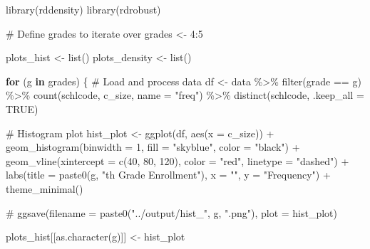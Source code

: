 \documentclass[
  letterpaper,
  DIV=11,
  numbers=noendperiod]{scrartcl}
\newenvironment{Shaded}{\begin{snugshade}}{\end{snugshade}}
\newcommand{\AttributeTok}[1]{\textcolor[rgb]{0.40,0.45,0.13}{#1}}
\newcommand{\CommentTok}[1]{\textcolor[rgb]{0.37,0.37,0.37}{#1}}
\newcommand{\ConstantTok}[1]{\textcolor[rgb]{0.56,0.35,0.01}{#1}}
\newcommand{\ControlFlowTok}[1]{\textcolor[rgb]{0.00,0.23,0.31}{\textbf{#1}}}
\newcommand{\DecValTok}[1]{\textcolor[rgb]{0.68,0.00,0.00}{#1}}
\newcommand{\FunctionTok}[1]{\textcolor[rgb]{0.28,0.35,0.67}{#1}}
\newcommand{\NormalTok}[1]{\textcolor[rgb]{0.00,0.23,0.31}{#1}}
\newcommand{\OtherTok}[1]{\textcolor[rgb]{0.00,0.23,0.31}{#1}}
\newcommand{\SpecialCharTok}[1]{\textcolor[rgb]{0.37,0.37,0.37}{#1}}
\newcommand{\StringTok}[1]{\textcolor[rgb]{0.13,0.47,0.30}{#1}}
\begin{document}
\begin{Shaded}
\begin{Highlighting}[]
\FunctionTok{library}\NormalTok{(rddensity)}
\FunctionTok{library}\NormalTok{(rdrobust)}

\CommentTok{\# Define grades to iterate over}
\NormalTok{grades }\OtherTok{\textless{}{-}} \DecValTok{4}\SpecialCharTok{:}\DecValTok{5}

\NormalTok{plots\_hist }\OtherTok{\textless{}{-}} \FunctionTok{list}\NormalTok{()}
\NormalTok{plots\_density }\OtherTok{\textless{}{-}} \FunctionTok{list}\NormalTok{()}

\ControlFlowTok{for}\NormalTok{ (g }\ControlFlowTok{in}\NormalTok{ grades) \{}
  \CommentTok{\# Load and process data}
\NormalTok{  df }\OtherTok{\textless{}{-}}\NormalTok{ data }\SpecialCharTok{\%\textgreater{}\%}
    \FunctionTok{filter}\NormalTok{(grade }\SpecialCharTok{==}\NormalTok{ g) }\SpecialCharTok{\%\textgreater{}\%}
    \FunctionTok{count}\NormalTok{(schlcode, c\_size, }\AttributeTok{name =} \StringTok{"freq"}\NormalTok{) }\SpecialCharTok{\%\textgreater{}\%}
    \FunctionTok{distinct}\NormalTok{(schlcode, }\AttributeTok{.keep\_all =} \ConstantTok{TRUE}\NormalTok{)}

  \CommentTok{\# Histogram plot}
\NormalTok{  hist\_plot }\OtherTok{\textless{}{-}} \FunctionTok{ggplot}\NormalTok{(df, }\FunctionTok{aes}\NormalTok{(}\AttributeTok{x =}\NormalTok{ c\_size)) }\SpecialCharTok{+}
    \FunctionTok{geom\_histogram}\NormalTok{(}\AttributeTok{binwidth =} \DecValTok{1}\NormalTok{, }\AttributeTok{fill =} \StringTok{"skyblue"}\NormalTok{, }\AttributeTok{color =} \StringTok{"black"}\NormalTok{) }\SpecialCharTok{+}
    \FunctionTok{geom\_vline}\NormalTok{(}\AttributeTok{xintercept =} \FunctionTok{c}\NormalTok{(}\DecValTok{40}\NormalTok{, }\DecValTok{80}\NormalTok{, }\DecValTok{120}\NormalTok{), }\AttributeTok{color =} \StringTok{"red"}\NormalTok{, }\AttributeTok{linetype =} \StringTok{"dashed"}\NormalTok{) }\SpecialCharTok{+}
    \FunctionTok{labs}\NormalTok{(}\AttributeTok{title =} \FunctionTok{paste0}\NormalTok{(g, }\StringTok{"th Grade Enrollment"}\NormalTok{), }\AttributeTok{x =} \StringTok{""}\NormalTok{, }\AttributeTok{y =} \StringTok{"Frequency"}\NormalTok{) }\SpecialCharTok{+}
    \FunctionTok{theme\_minimal}\NormalTok{()}

  \CommentTok{\# ggsave(filename = paste0("../output/hist\_", g, ".png"), plot = hist\_plot)}

\NormalTok{  plots\_hist[[}\FunctionTok{as.character}\NormalTok{(g)]] }\OtherTok{\textless{}{-}}\NormalTok{ hist\_plot}


\end{Highlighting}
\end{Shaded}
\end{document}
